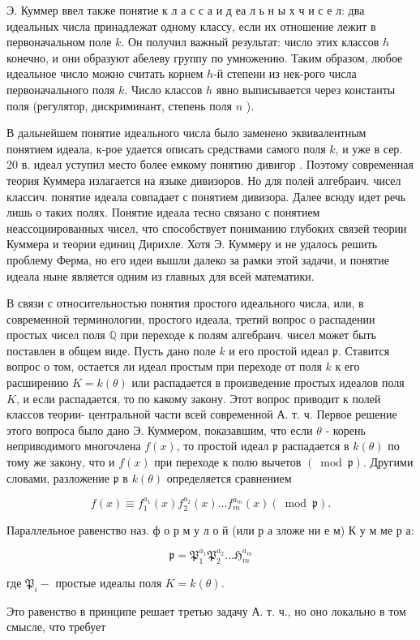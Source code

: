 \documentclass[10pt]{article}
\begin{document}
Э. Куммер ввел также понятие к л а с с а и д еа л ь н ы х ч и с е л: два идеальных числа принадлежат одному классу, если их отношение лежит в первоначальном поле $k$. Он получил важный результат: число этих классов $h$ конечно, и они образуют абелеву группу по умножению. Таким образом, любое идеальное число можно считать корнем $h$-й степени из нек-рого числа первоначального поля $k$. Число классов $h$ явно выписывается через константы поля (регулятор, дискриминант, степень поля $n$ ).



В дальнейшем понятие идеального числа было заменено эквивалентным понятием идеала, к-рое удается описать средствами самого поля $k$, и уже в сер. 20 в. идеал уступил место более емкому понятию дивигор . Поэтому современная теория Куммера излагается на языке дивизоров. Но для полей алгебраич. чисел классич. понятие идеала совпадает с понятием дивизора. Далее всюду идет речь лишь о таких полях. Понятие идеала тесно связано с понятием неассоциированных чисел, что способствует пониманию глубоких связей теории Куммера и теории единиц Дирихле. Хотя Э. Куммеру и не удалось решить проблему Ферма, но его идеи вышли далеко за рамки этой задачи, и понятие идеала ныне является одним из главных для всей математики.



В связи с относительностью понятия простого идеального числа, или, в современной терминологии, простого идеала, третий вопрос о распадении простых чисел поля $\mathbb{Q}$ при переходе к полям алгебраич. чисел может быть поставлен в общем виде. Пусть дано поле $k$ и его простой идеал $\mathfrak{p}$. Ставится вопрос о том, остается ли идеал простым при переходе от поля $k$ к его расширению $K=k(\theta)$ или распадается в произведение простых идеалов поля $K$, и если распадается, то по какому закону. Этот вопрос приводит к полей классов теории- центральной части всей современной А. т. ч. Первое решение этого вопроса было дано Э. Куммером, показавшим, что если $\theta$ - корень неприводимого многочлена $f(x)$, то простой идеал $\mathfrak{p}$ распадается в $k(\theta)$ по тому же закону, что и $f(x)$ при переходе к полю вычетов $(\bmod \mathfrak{p})$. Другими словами, разложение $\mathfrak{p}$ в $k(\theta)$ определяется сравнением



\[

f(x) \equiv f_{1}^{a_{1}}(x) f_{2}^{a_{2}}(x) \ldots f_{m}^{a_{m}}(x)(\bmod \mathfrak{p}) .

\]



Параллельное равенство наз. ф о р м у л о й (или р а зложе ни е м) К у м ме р а:



\[

\mathfrak{p}=\mathfrak{P}_{1}^{a_{1}} \mathfrak{P}_{2}^{a_{2}} \ldots \mathfrak{H}_{m}^{a_{m}}

\]



где $\mathfrak{P}_{i}-$ простые идеалы поля $K=k(\theta)$.



Это равенство в принципе решает третью задачу А. т. ч., но оно локально в том смысле, что требует
\end{document}
